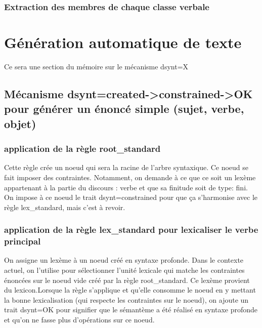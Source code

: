 \documentclass[12pt,maitrise,frenchb,natbib,twoside,initial]{dms}
\numberwithin{equation}{section}
\numberwithin{table}{chapter}
\numberwithin{figure}{chapter}
\begin{document}
\subsection{Extraction des membres de chaque classe verbale}

\subsubsection{}


\chapter{Génération automatique de texte}

Ce sera une section du mémoire sur le mécanisme dsynt=X

\section{Mécanisme dsynt=created->constrained->OK pour générer un énoncé simple (sujet, verbe, objet)}

\subsection{application de la règle root{\_}standard}
Cette règle crée un noeud qui sera la racine de l'arbre syntaxique. Ce noeud se fait imposer des contraintes. Notamment, on demande à ce que ce soit un lexème appartenant à la partie du discours : verbe et que sa finitude soit de type: fini. On impose à ce noeud le trait dsynt=constrained pour que ça s'harmonise avec le règle lex{\_}standard, mais c'est à revoir.

\subsection{application de la règle lex{\_}standard pour lexicaliser le verbe principal}
On assigne un lexème à un noeud  créé en syntaxe profonde. Dans le contexte actuel, on l'utilise pour sélectionner l'unité lexicale qui matche les contraintes énoncées sur le noeud vide créé par la règle root{\_}standard. Ce lexème provient du lexicon.Lorsque la règle s'applique et qu'elle consomme le noeud en y mettant la bonne lexicalisation (qui respecte les contraintes sur le noeud), on ajoute un trait dsynt=OK pour signifier que le sémantème a été réalisé en syntaxe profonde et qu'on ne fasse plus d'opérations sur ce noeud.
\end{document}
